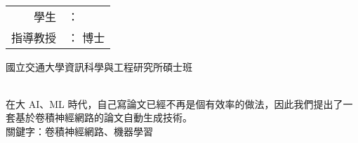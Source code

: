 \newpage
\begin{center}
  \LARGE
  \begin{singlespace}
    \textbf{\chineseTitle{}} \\[0.5cm]
  \end{singlespace}

  \begin{singlespace}    
  \begin{tabular}{r l}
    學生 & ：\studentChName{} \\
    指導教授 & ：\advisorChName{} \hspace{0.1cm} 博士 \\[0.5cm]
  \end{tabular}
  \end{singlespace}

  國立交通大學資訊科學與工程研究所碩士班 \\[0.5cm]
    
   \\[0.5cm]
\end{center}

\normalsize 
在大 AI、ML 時代，自己寫論文已經不再是個有效率的做法，因此我們提出了一套基於卷積神經網路的論文自動生成技術。 \\[0.7cm]

關鍵字：卷積神經網路、機器學習